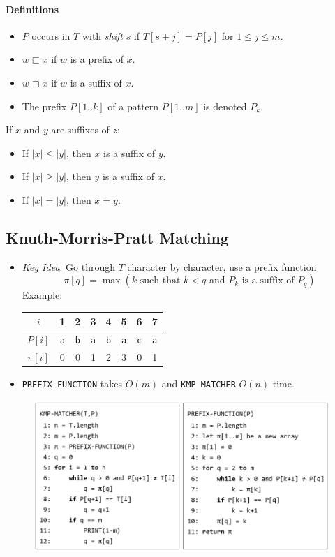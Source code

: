\documentclass[twocolumn,english]{article}
\providecommand{\tabularnewline}{\\}
\numberwithin{equation}{section}
\numberwithin{figure}{section}
\numberwithin{table}{section}
\providecommand{\tabularnewline}{\\}
\begin{document}
\paragraph{Definitions}
\begin{itemize}
\item $P$ occurs in $T$ with \emph{shift} $s$ if $T\left[s+j\right]=P\left[j\right]$
for $1\leq j\leq m$.
\item $w\sqsubset x$ if $w$ is a prefix of $x$.
\item $w\sqsupset x$ if $w$ is a suffix of $x$.
\item The prefix $P\left[1..k\right]$ of a pattern $P\left[1..m\right]$
is denoted $P_{k}$.
\end{itemize}
If $x$ and $y$ are suffixes of $z$:
\begin{itemize}
\item If $\left|x\right|\leq\left|y\right|$, then $x$ is a suffix of $y$.
\item If $\left|x\right|\geq\left|y\right|$, then $y$ is a suffix of $x$.
\item If $\left|x\right|=\left|y\right|$, then $x=y$.
\end{itemize}

\subsection{Knuth-Morris-Pratt Matching}
\begin{itemize}
\item \emph{Key Idea}: Go through $T$ character by character, use a prefix
function
\[
\pi\left[q\right]=\max\left(k\text{ such that }k<q\text{ and }P_{k}\text{ is a suffix of }P_{q}\right)
\]
Example:
\begin{table}[H]
\centering{}%
\begin{tabular}{cccccccc}
\toprule 
$i$ & 1 & 2 & 3 & 4 & 5 & 6 & 7\tabularnewline
\midrule
$P\left[i\right]$ & \texttt{a} & \texttt{b} & \texttt{a} & \texttt{b} & \texttt{a} & \texttt{c} & \texttt{a}\tabularnewline
$\pi\left[i\right]$ & 0 & 0 & 1 & 2 & 3 & 0 & 1\tabularnewline
\bottomrule
\end{tabular}
\end{table}
\item \texttt{PREFIX-FUNCTION} takes $O\left(m\right)$ and \texttt{KMP-MATCHER}
$O\left(n\right)$ time.
\end{itemize}
\begin{figure}[H]
\centering{}\includegraphics[width=0.8\linewidth]{img/kmp-matching}
\end{figure}
\end{document}
